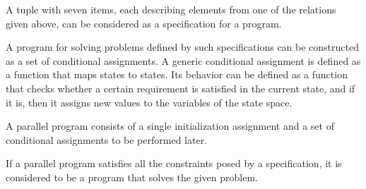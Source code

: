 A tuple with seven items, each describing elements from one of the relations given above, can be considered as a specification for a program.

A program for solving problems defined by such specifications can be constructed as a set of conditional assignments. A generic conditional assignment is defined as a function that maps states to states. Its behavior can be defined as a function that checks whether a certain requirement is satisfied in the current state, and if it is, then it assigns new values to the variables of the state space.

A parallel program consists of a single initialization assignment and a set of conditional assignments to be performed later.

If a parallel program satisfies all the constraints posed by a specification, it is considered to be a program that solves the given problem.




